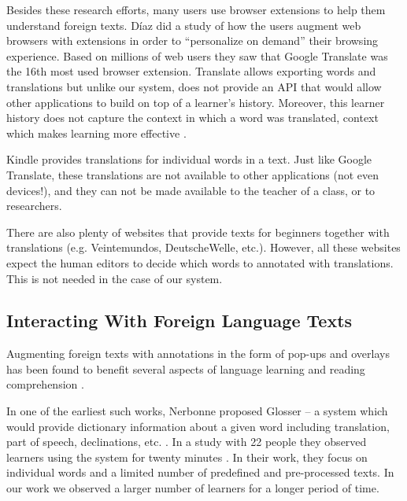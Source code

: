 
Besides these research efforts, many users use browser extensions to help them understand foreign texts. D\'iaz \cite{Diaz15-Augmented} did a study of how the users augment web browsers with extensions in order to ``personalize on demand'' their browsing experience. Based on millions of web users they saw that Google Translate was the 16th most used browser extension. 
Translate allows exporting words and translations but unlike our system, does not provide an API that would allow other applications to build on top of a learner's history. Moreover, this learner history does not capture the context in which a word was translated, context which makes learning more effective \cite{nagy95-context}. 

Kindle provides translations for individual words in a text. Just like Google Translate, these translations are not available to other applications (not even devices!), and they can not be made available to the teacher of a class, or to researchers. 

There are also plenty of websites that provide texts for beginners together with translations (e.g. Veintemundos, DeutscheWelle, etc.). However, all these websites expect the human editors to decide which words to annotated with translations. This is not needed in the case of our system. 


\subsection{Interacting With Foreign Language Texts}

Augmenting foreign texts with annotations in the form of pop-ups and overlays has been found to benefit several aspects of language learning \cite{DeRidder02-Links} and reading comprehension \cite{Sanko06-Effects}.



	In one of the earliest such works, Nerbonne proposed Glosser -- a system which would provide dictionary information about a given word including translation, part of speech, declinations, etc. \cite{Nerb99-Assistant}.
	In a study with 22 people they observed learners using the system for twenty minutes \cite{Dokter98-UserStudy}. 
	In their work, they focus on individual words and a limited number of predefined and pre-processed texts. 
	In our work we observed a larger number of learners for a longer period of time.


